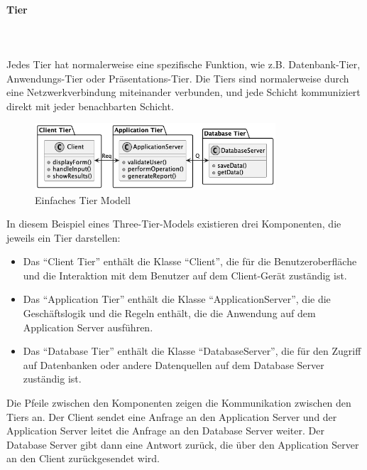 \documentclass[../vs-script-first-v01.tex]{subfiles}
\begin{document}
\paragraph{Tier}\mbox{}\\
\mbox{}\\
Jedes Tier hat normalerweise eine spezifische Funktion, wie z.B. Datenbank-Tier, Anwendungs-Tier oder Präsentations-Tier. Die Tiers sind normalerweise durch eine Netzwerkverbindung miteinander verbunden, und jede Schicht kommuniziert direkt mit jeder benachbarten Schicht.
\begin{figure}[!h]
  \centering
  \includegraphics[width=0.80\textwidth]{fig/uml/simple-tiers.png}
  \caption{Einfaches Tier Modell}
  \label{fig:simple-tier}
\end{figure}
In diesem Beispiel eines Three-Tier-Models existieren drei Komponenten, die jeweils ein Tier darstellen:
\begin{itemize}
\item Das \enquote{Client Tier} enthält die Klasse \enquote{Client}, die für die Benutzeroberfläche und die Interaktion mit dem Benutzer auf dem Client-Gerät zuständig ist.

\item Das \enquote{Application Tier} enthält die Klasse \enquote{ApplicationServer}, die die Geschäftslogik und die Regeln enthält, die die Anwendung auf dem Application Server ausführen.

\item Das \enquote{Database Tier} enthält die Klasse \enquote{DatabaseServer}, die für den Zugriff auf Datenbanken oder andere Datenquellen auf dem Database Server zuständig ist.
\end{itemize}
Die Pfeile zwischen den Komponenten zeigen die Kommunikation zwischen den Tiers an. Der Client sendet eine Anfrage an den Application Server und der Application Server leitet die Anfrage an den Database Server weiter. Der Database Server gibt dann eine Antwort zurück, die über den Application Server an den Client zurückgesendet wird.
\\
\end{document}
